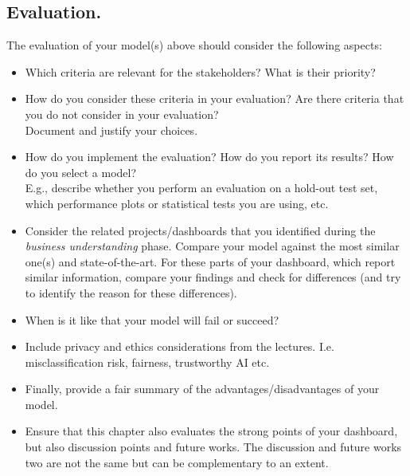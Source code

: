
\subsection{Evaluation.}
The evaluation of your model(s) above should consider the following aspects:
\begin{itemize}
  \setlength\itemsep{0em}
  \item Which criteria are relevant for the stakeholders? What is their priority?
  \item How do you consider these criteria in your evaluation? Are there criteria that you do not consider in your evaluation?
    \\ Document and justify your choices.
  \item How do you implement the evaluation? How do you report its results? How do you select a model?
    \\ E.g., describe whether you perform an evaluation on a hold-out test set, which performance plots or statistical tests you are using, etc.
    \item Consider the related projects/dashboards that you identified during the \emph{business understanding} phase. Compare your model against the most similar one(s) and state-of-the-art. For these parts of your dashboard, which report similar information, compare your findings and check for differences (and try to identify the reason for these differences).
    \item When is it like that your model will fail or succeed?
    \item Include privacy and ethics considerations from the lectures. I.e. misclassification risk, fairness, trustworthy AI etc.
    \item Finally, provide a fair summary of the advantages/disadvantages of your model. 
    \item Ensure that this chapter also evaluates the strong points of your dashboard, but also discussion points and future works. The discussion and future works two are not the same but can be complementary to an extent. 
    
\end{itemize}


